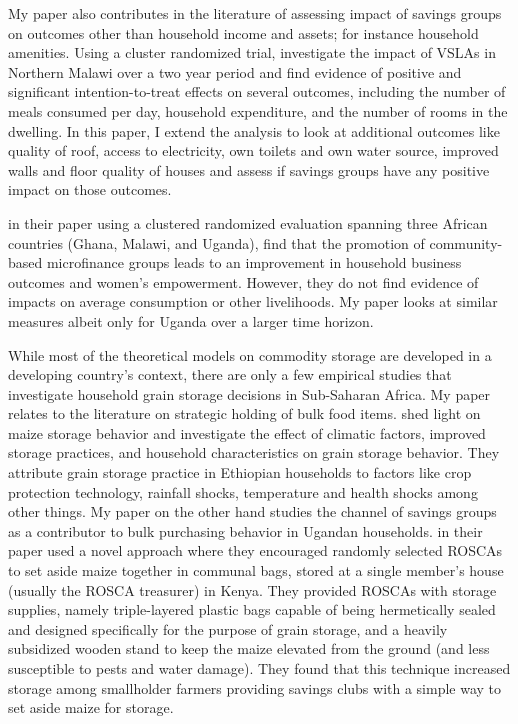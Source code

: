 \documentclass[12pt]{article}
\begin{document}
{\hspace{1cm} My paper also contributes in the literature of assessing impact of savings groups on outcomes other than household income and assets; for instance household amenities. Using a cluster randomized trial, \cite{ksoll} investigate the impact of VSLAs in Northern Malawi over a two year period and find evidence of positive and significant intention-to-treat effects on several outcomes, including the number of meals consumed per day, household expenditure, and the number of rooms in the dwelling. In this paper, I extend the analysis to look at additional outcomes like quality of roof, access to electricity, own toilets and own water source, improved walls and floor quality of houses and assess if savings groups have any positive impact on those outcomes.  

\hspace{1cm}
 \cite{karlan} in their paper using a clustered randomized evaluation spanning three African countries (Ghana, Malawi, and Uganda), find that the promotion of community-based microfinance groups leads to an improvement in household business outcomes and women’s empowerment. However,
they do not find evidence of impacts on average consumption or other livelihoods. My paper looks at similar measures albeit only for Uganda over a larger time horizon.

\hspace{1cm} While most of the theoretical models on commodity storage are developed in a developing country’s context, there are only a few empirical studies that investigate household grain storage decisions in Sub-Saharan Africa. My paper relates to the literature on strategic holding of bulk food items. \cite{tesfaye} shed light on maize storage behavior and investigate the effect of climatic factors, improved storage practices, and household characteristics on grain storage behavior. They attribute grain storage practice in Ethiopian households to factors like crop protection technology, rainfall shocks, temperature and health shocks among other things. My paper on the other hand studies the channel of savings groups as a contributor to bulk purchasing behavior in Ugandan households. \cite{aggarwal} in their paper used a novel approach where they encouraged randomly selected ROSCAs to set aside maize together in communal bags, stored at a single member's house (usually the ROSCA treasurer) in Kenya. They provided ROSCAs with storage supplies, namely triple-layered plastic bags capable of being hermetically sealed and designed specifically for the purpose of grain storage, and a heavily subsidized wooden stand to keep the maize elevated from the ground (and less susceptible to pests and water damage). They found that this technique increased storage among smallholder farmers providing savings clubs with a simple way to set aside maize for storage.

}
\end{document}
